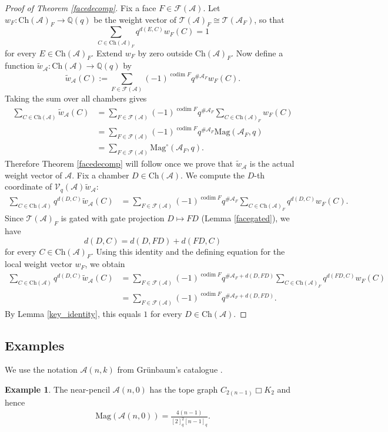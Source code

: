 \documentclass{amsart}
\numberwithin{equation}{section}
\theoremstyle{plain}
\theoremstyle{remark}
\theoremstyle{definition}
\newtheorem{ex}[thm]{Example}
\numberwithin{equation}{section}
\newcommand{\A}{\mathcal{A}}
\newcommand{\T}{\mathcal{T}}
\newcommand{\FF}{\mathcal{F}}
\newcommand{\Q}{\mathbb{Q}}
\newcommand{\Mag}{\mathrm{Mag}}
\newcommand{\Ch}{\mathrm{Ch}}
\DeclareMathOperator{\codim}{codim}
\begin{document}
\begin{proof}[Proof of Theorem \ref{facedecomp}]
Fix a face $F\in \FF(\A)$.
Let $w_F\colon \Ch(\A)_F\to \Q(q)$ be the weight vector of $\T(\A)_F\cong \T(\A_F)$, so that
\[
\sum_{C\in \Ch(\A)_F} q^{d(E,C)}w_F(C)=1
\]
for every $E\in \Ch(\A)_F$.
Extend $w_F$ by zero outside $\Ch(\A)_F$.
Now define a function $\widetilde w_\A\colon \Ch(\A)\to \Q(q)$ by
\[
\widetilde w_\A(C)
:=\sum_{F\in \FF(\A)}(-1)^{\codim F}q^{\#\A_F}w_F(C).
\]
Taking the sum over all chambers gives
\begin{align*}
\sum_{C\in \Ch(\A)}\widetilde w_\A(C)
&=\sum_{F\in \FF(\A)}(-1)^{\codim F}q^{\#\A_F}
\sum_{C\in \Ch(\A)_F}w_F(C)\\
&=\sum_{F\in \FF(\A)}(-1)^{\codim F}q^{\#\A_F}\Mag(\A_F,q)\\
&=\sum_{F\in \FF(\A)}\Mag^{\circ}(\A_F,q).
\end{align*}
Therefore Theorem \ref{facedecomp} will follow once we prove that $\widetilde w_\A$ is the actual weight vector of $\A$.
Fix a chamber $D\in \Ch(\A)$. We compute the $D$-th coordinate of $\mathcal{V}_q(\A)\widetilde w_\A$:
\begin{align*}
\sum_{C\in \Ch(\A)} q^{d(D,C)}\widetilde w_\A(C)
&=\sum_{F\in \FF(\A)}(-1)^{\codim F}q^{\#\A_F}
\sum_{C\in \Ch(\A)_F} q^{d(D,C)}w_F(C).
\end{align*}
Since $\T(\A)_F$ is gated with gate projection $D\mapsto FD$ (Lemma \ref{facegated}), we have
\[
d(D,C)=d(D,FD)+d(FD,C)
\]
for every $C\in \Ch(\A)_F$.
Using this identity and the defining equation for the local weight vector $w_F$, we obtain
\begin{align*}
\sum_{C\in \Ch(\A)} q^{d(D,C)}\widetilde w_\A(C)
&=\sum_{F\in \FF(\A)}(-1)^{\codim F}q^{\#\A_F+d(D,FD)}
\sum_{C\in \Ch(\A)_F} q^{d(FD,C)}w_F(C)\\
&=\sum_{F\in \FF(\A)}(-1)^{\codim F}q^{\#\A_F+d(D,FD)}.
\end{align*}
By Lemma \ref{key_identity}, this equals $1$ for every $D\in \Ch(\A)$.
\end{proof}


\subsection{Examples} \label{firstexamples}


We use the notation $\A(n,k)$ from Gr\"unbaum's catalogue \cite{Grunbaum2009}.

\begin{ex}\label{nearpencil}
    The near-pencil $\A(n,0)$ has the tope graph $C_{2(n-1)}\Box K_2$ and hence
    \begin{align*}
        \Mag(\A(n,0))=\frac{4(n-1)}{[2]_q^2[n-1]_q}.
    \end{align*}
\end{ex}
\end{document}
